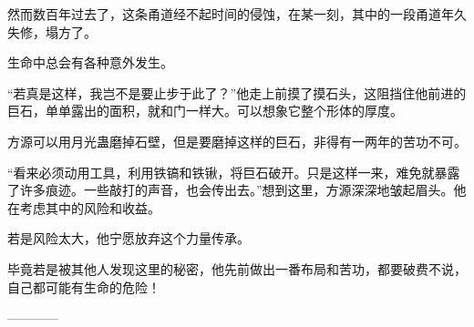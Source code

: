 \begin{this_body}
然而数百年过去了，这条甬道经不起时间的侵蚀，在某一刻，其中的一段甬道年久失修，塌方了。

生命中总会有各种意外发生。

“若真是这样，我岂不是要止步于此了？”他走上前摸了摸石头，这阻挡住他前进的巨石，单单露出的面积，就和门一样大。可以想象它整个形体的厚度。

方源可以用月光蛊磨掉石壁，但是要磨掉这样的巨石，非得有一两年的苦功不可。

“看来必须动用工具，利用铁镐和铁锹，将巨石破开。只是这样一来，难免就暴露了许多痕迹。一些敲打的声音，也会传出去。”想到这里，方源深深地皱起眉头。他在考虑其中的风险和收益。

若是风险太大，他宁愿放弃这个力量传承。

毕竟若是被其他人发现这里的秘密，他先前做出一番布局和苦功，都要破费不说，自己都可能有生命的危险！

------------

\end{this_body}

